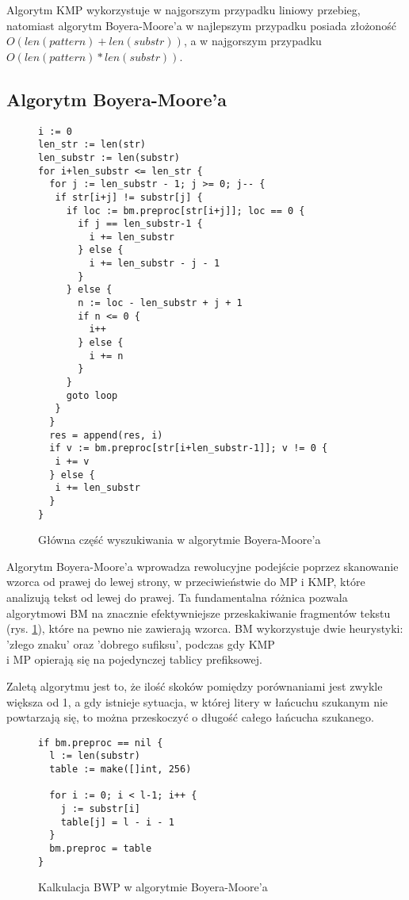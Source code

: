 Algorytm KMP wykorzystuje w najgorszym przypadku liniowy przebieg, natomiast
algorytm Boyera-Moore'a w najlepszym przypadku posiada złożoność $O({len(pattern)}+{len(substr)})$, a w 
najgorszym przypadku $O({len(pattern)}*{len(substr)})$.

\subsection{Algorytm Boyera-Moore'a}
\label{sch:algoBoyerMoore}

\begin{figure}[htbp]
    \centering
    \begin{lstlisting}
i := 0
len_str := len(str)
len_substr := len(substr)
for i+len_substr <= len_str {
  for j := len_substr - 1; j >= 0; j-- {
   if str[i+j] != substr[j] {
     if loc := bm.preproc[str[i+j]]; loc == 0 {
       if j == len_substr-1 {
         i += len_substr
       } else {
         i += len_substr - j - 1
       }
     } else {
       n := loc - len_substr + j + 1
       if n <= 0 {
         i++
       } else {
         i += n
       }
     }
     goto loop
   }
  }
  res = append(res, i)
  if v := bm.preproc[str[i+len_substr-1]]; v != 0 {
   i += v
  } else {
   i += len_substr
  }
}
    \end{lstlisting}
    \caption{Główna część wyszukiwania w algorytmie Boyera-Moore'a}
    \label{fig:code:BMmain}
\end{figure}

Algorytm Boyera-Moore'a wprowadza rewolucyjne podejście poprzez skanowanie 
wzorca od prawej do lewej strony, w przeciwieństwie do MP i KMP, które 
analizują tekst od lewej do prawej. Ta fundamentalna różnica pozwala algorytmowi BM na 
znacznie efektywniejsze przeskakiwanie fragmentów tekstu (rys. \ref{fig:code:BMmain}), które na pewno nie 
zawierają wzorca. BM wykorzystuje dwie heurystyki: 'złego znaku' oraz 'dobrego
sufiksu', podczas gdy KMP \\ i MP opierają się na pojedynczej tablicy prefiksowej.

Zaletą algorytmu jest to, że ilość skoków pomiędzy porównaniami jest zwykle 
większa od 1, a gdy istnieje sytuacja, w której litery w łańcuchu szukanym nie
powtarzają się, to można przeskoczyć o długość całego łańcucha szukanego.

\begin{figure}[htbp]
    \centering
    \begin{lstlisting}
if bm.preproc == nil {
  l := len(substr)
  table := make([]int, 256)

  for i := 0; i < l-1; i++ {
    j := substr[i]
    table[j] = l - i - 1
  }
  bm.preproc = table
}
    \end{lstlisting}
    \caption{Kalkulacja BWP w algorytmie Boyera-Moore'a}
    \label{fig:code:BMpreproc}
\end{figure}

